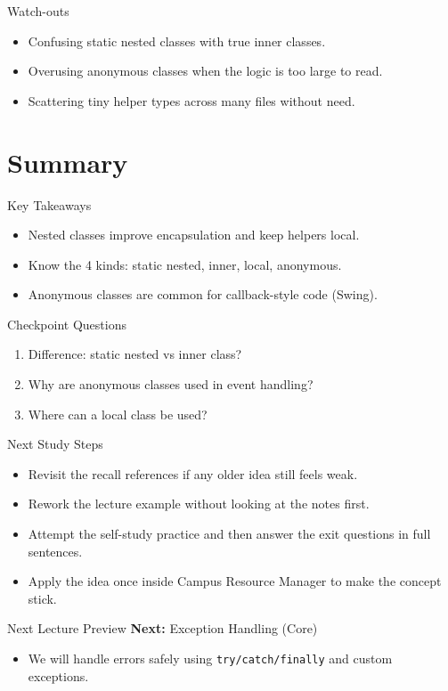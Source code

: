 \documentclass{beamer}
\begin{document}
\begin{frame}{Watch-outs}
\begin{itemize}[<+->]
  \item Confusing static nested classes with true inner classes.
  \item Overusing anonymous classes when the logic is too large to read.
  \item Scattering tiny helper types across many files without need.
\end{itemize}
  \slidesources{\OOPSUnitIIISources}
\end{frame}

\section{Summary}
\label{sec:summary}

\begin{frame}{Key Takeaways}
  \begin{itemize}[<+->]
    \item Nested classes improve encapsulation and keep helpers local.
    \item Know the 4 kinds: static nested, inner, local, anonymous.
    \item Anonymous classes are common for callback-style code (Swing).
  \end{itemize}
  \slidesources{\OOPSUnitIIISources}
\end{frame}

\begin{frame}{Checkpoint Questions}
  \begin{enumerate}[<+->]
    \item Difference: static nested vs inner class?
    \item Why are anonymous classes used in event handling?
    \item Where can a local class be used?
  \end{enumerate}
  \slidesources{\OOPSUnitIIISources}
\end{frame}

\begin{frame}{Next Study Steps}
\begin{itemize}[<+->]
  \item Revisit the recall references if any older idea still feels weak.
  \item Rework the lecture example without looking at the notes first.
  \item Attempt the self-study practice and then answer the exit questions in full sentences.
  \item Apply the idea once inside Campus Resource Manager to make the concept stick.
\end{itemize}
  \slidesources{\OOPSUnitIIISources}
\end{frame}

\begin{frame}{Next Lecture Preview}
  \textbf{Next:} Exception Handling (Core)
  \vspace{0.6em}
  \begin{itemize}[<+->]
    \item We will handle errors safely using \texttt{try/catch/finally} and custom exceptions.
  \end{itemize}
  \slidesources{\OOPSUnitIIISources}
\end{frame}
\end{document}
